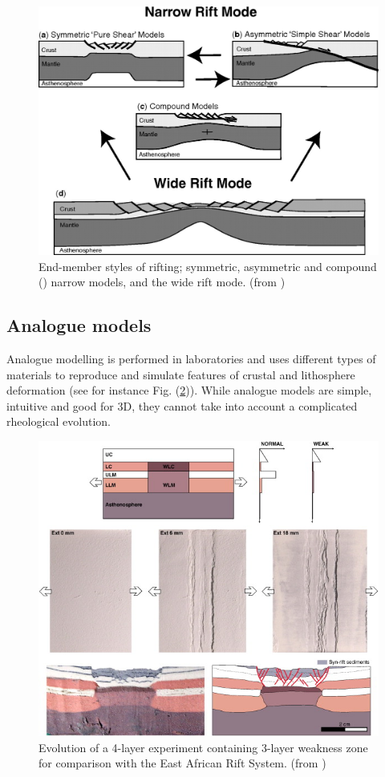 \documentclass[a4paper]{article}
\begin{document}
\begin{figure}[h!]
\centering
\includegraphics[scale=0.2]{images/Lfig1.jpg}
\caption{End-member styles of rifting; symmetric, asymmetric and compound (\cite{lies86}) narrow models, and the wide rift mode. (from \cite{hube07})}
\label{conceptModel}
\end{figure}

\subsection{Analogue models}

Analogue modelling is performed in laboratories and uses different types of materials to reproduce and simulate features of crustal and lithosphere deformation (see for instance Fig. (\ref{analogModel})). While analogue models are simple, intuitive and good for 3D, they cannot take into account a complicated rheological evolution. 

\begin{figure}[h!]
\centering
\includegraphics[scale=0.8]{images/Lfig2.jpg}
\caption{Evolution of a 4-layer experiment containing 3-layer weakness zone for comparison with the East African Rift System. (from \cite{cort12})}
\label{analogModel}
\end{figure}
\end{document}
